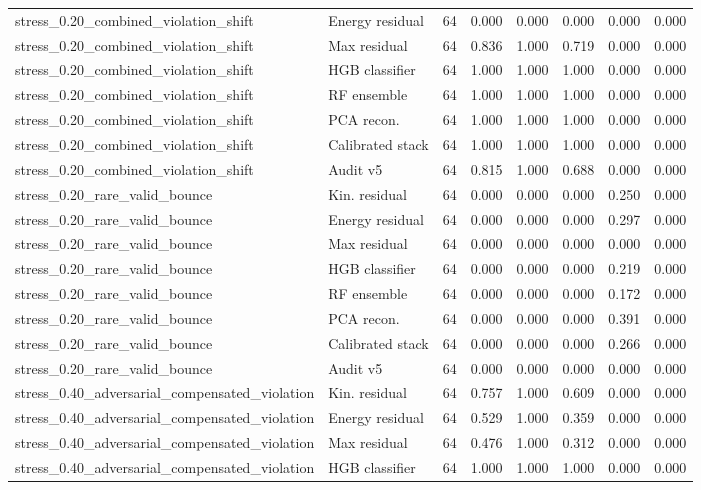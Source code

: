 {\begin{longtable}{llrrrrrr}
stress\_0.20\_combined\_violation\_shift & Energy residual & 64 & 0.000 & 0.000 & 0.000 & 0.000 & 0.000 \\
stress\_0.20\_combined\_violation\_shift & Max residual & 64 & 0.836 & 1.000 & 0.719 & 0.000 & 0.000 \\
stress\_0.20\_combined\_violation\_shift & HGB classifier & 64 & 1.000 & 1.000 & 1.000 & 0.000 & 0.000 \\
stress\_0.20\_combined\_violation\_shift & RF ensemble & 64 & 1.000 & 1.000 & 1.000 & 0.000 & 0.000 \\
stress\_0.20\_combined\_violation\_shift & PCA recon. & 64 & 1.000 & 1.000 & 1.000 & 0.000 & 0.000 \\
stress\_0.20\_combined\_violation\_shift & Calibrated stack & 64 & 1.000 & 1.000 & 1.000 & 0.000 & 0.000 \\
stress\_0.20\_combined\_violation\_shift & Audit v5 & 64 & 0.815 & 1.000 & 0.688 & 0.000 & 0.000 \\
stress\_0.20\_rare\_valid\_bounce & Kin. residual & 64 & 0.000 & 0.000 & 0.000 & 0.250 & 0.000 \\
stress\_0.20\_rare\_valid\_bounce & Energy residual & 64 & 0.000 & 0.000 & 0.000 & 0.297 & 0.000 \\
stress\_0.20\_rare\_valid\_bounce & Max residual & 64 & 0.000 & 0.000 & 0.000 & 0.000 & 0.000 \\
stress\_0.20\_rare\_valid\_bounce & HGB classifier & 64 & 0.000 & 0.000 & 0.000 & 0.219 & 0.000 \\
stress\_0.20\_rare\_valid\_bounce & RF ensemble & 64 & 0.000 & 0.000 & 0.000 & 0.172 & 0.000 \\
stress\_0.20\_rare\_valid\_bounce & PCA recon. & 64 & 0.000 & 0.000 & 0.000 & 0.391 & 0.000 \\
stress\_0.20\_rare\_valid\_bounce & Calibrated stack & 64 & 0.000 & 0.000 & 0.000 & 0.266 & 0.000 \\
stress\_0.20\_rare\_valid\_bounce & Audit v5 & 64 & 0.000 & 0.000 & 0.000 & 0.000 & 0.000 \\
stress\_0.40\_adversarial\_compensated\_violation & Kin. residual & 64 & 0.757 & 1.000 & 0.609 & 0.000 & 0.000 \\
stress\_0.40\_adversarial\_compensated\_violation & Energy residual & 64 & 0.529 & 1.000 & 0.359 & 0.000 & 0.000 \\
stress\_0.40\_adversarial\_compensated\_violation & Max residual & 64 & 0.476 & 1.000 & 0.312 & 0.000 & 0.000 \\
stress\_0.40\_adversarial\_compensated\_violation & HGB classifier & 64 & 1.000 & 1.000 & 1.000 & 0.000 & 0.000 \\

\end{longtable}}
